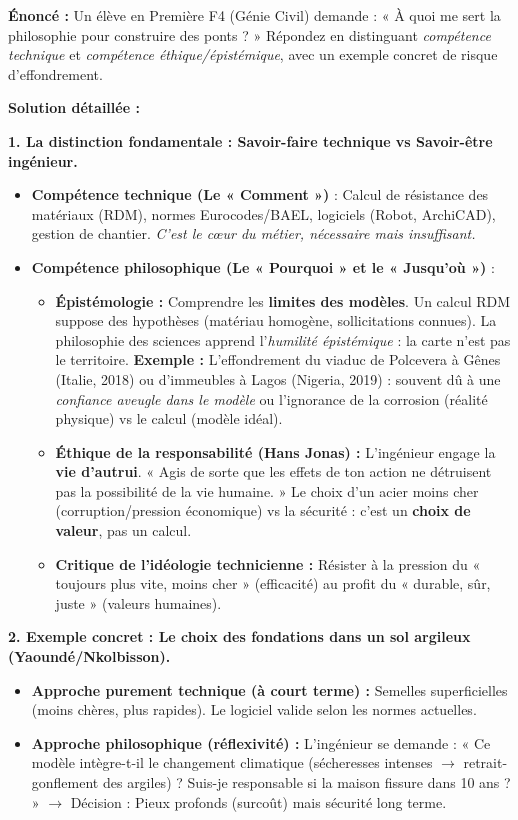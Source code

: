 \documentclass[11pt]{article}
\begin{document}
\begin{exoresolu}
\textbf{Énoncé :} Un élève en Première F4 (Génie Civil) demande : « À quoi me sert la philosophie pour construire des ponts ? » Répondez en distinguant \emph{compétence technique} et \emph{compétence éthique/épistémique}, avec un exemple concret de risque d'effondrement.

\tcblower
\textbf{Solution détaillée :}

\textbf{1. La distinction fondamentale : Savoir-faire technique vs Savoir-être ingénieur.}
\begin{itemize}
    \item \textbf{Compétence technique (Le « Comment »)} : Calcul de résistance des matériaux (RDM), normes Eurocodes/BAEL, logiciels (Robot, ArchiCAD), gestion de chantier. \emph{C'est le cœur du métier, nécessaire mais insuffisant.}
    \item \textbf{Compétence philosophique (Le « Pourquoi » et le « Jusqu'où »)} :
    \begin{itemize}
        \item \textbf{Épistémologie :} Comprendre les \textbf{limites des modèles}. Un calcul RDM suppose des hypothèses (matériau homogène, sollicitations connues). La philosophie des sciences apprend l'\emph{humilité épistémique} : la carte n'est pas le territoire. \textbf{Exemple :} L'effondrement du viaduc de Polcevera à Gênes (Italie, 2018) ou d'immeubles à Lagos (Nigeria, 2019) : souvent dû à une \emph{confiance aveugle dans le modèle} ou l'ignorance de la corrosion (réalité physique) vs le calcul (modèle idéal).
        \item \textbf{Éthique de la responsabilité (Hans Jonas) :} L'ingénieur engage la \textbf{vie d'autrui}. « Agis de sorte que les effets de ton action ne détruisent pas la possibilité de la vie humaine. » Le choix d'un acier moins cher (corruption/pression économique) vs la sécurité : c'est un \textbf{choix de valeur}, pas un calcul.
        \item \textbf{Critique de l'idéologie technicienne :} Résister à la pression du « toujours plus vite, moins cher » (efficacité) au profit du « durable, sûr, juste » (valeurs humaines).
    \end{itemize}
\end{itemize}

\textbf{2. Exemple concret : Le choix des fondations dans un sol argileux (Yaoundé/Nkolbisson).}
\begin{itemize}
    \item \textbf{Approche purement technique (à court terme) :} Semelles superficielles (moins chères, plus rapides). Le logiciel valide selon les normes actuelles.
    \item \textbf{Approche philosophique (réflexivité) :} L'ingénieur se demande : « Ce modèle intègre-t-il le changement climatique (sécheresses intenses $\rightarrow$ retrait-gonflement des argiles) ? Suis-je responsable si la maison fissure dans 10 ans ? » $\rightarrow$ Décision : Pieux profonds (surcoût) mais sécurité long terme.
\end{itemize}


\end{exoresolu}
\end{document}
